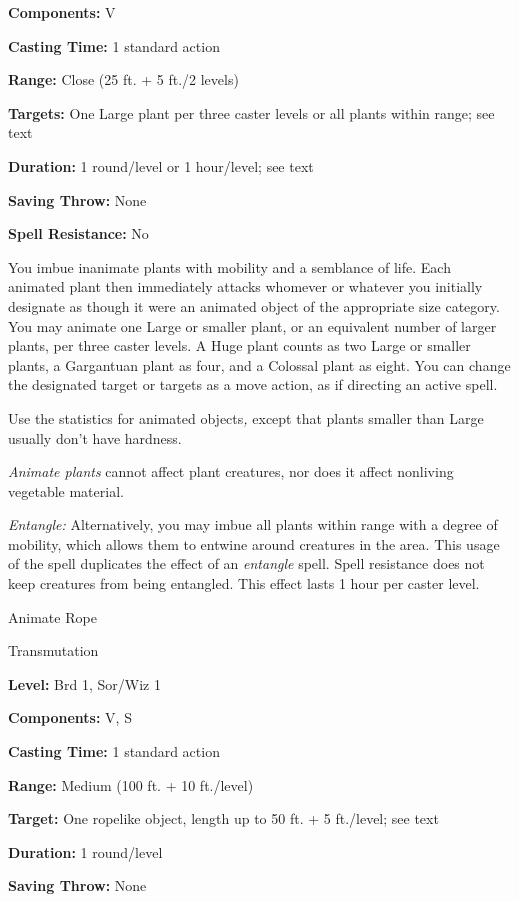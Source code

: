 \documentclass{article}
\begin{document}
\textbf{Components:} V

\textbf{Casting Time:} 1 standard action

\textbf{Range:} Close (25 ft. + 5 ft./2 levels)

\textbf{Targets:} One Large plant per three caster levels or all plants within 
range; see text

\textbf{Duration:} 1 round/level or 1 hour/level; see text

\textbf{Saving Throw:} None

\textbf{Spell Resistance:} No

You imbue inanimate plants with mobility and a semblance of life. Each animated 
plant then immediately attacks whomever or whatever you initially designate as 
though it were an animated object of the appropriate size category. You may animate 
one Large or smaller plant, or an equivalent number of larger plants, per three 
caster levels. A Huge plant counts as two Large or smaller plants, a Gargantuan 
plant as four, and a Colossal plant as eight. You can change the designated target 
or targets as a move action, as if directing an active spell.

Use the statistics for animated objects\textit{, }except that plants smaller than 
Large usually don't have hardness.

\textit{Animate plants }cannot affect plant creatures, nor does it affect nonliving 
vegetable material.

\textit{Entangle: }Alternatively, you may imbue all plants within range with a 
degree of mobility, which allows them to entwine around creatures in the area. 
This usage of the spell duplicates the effect of an \textit{entangle }spell. Spell 
resistance does not keep creatures from being entangled. This effect lasts 1 hour 
per caster level.

\vspace{12pt}
Animate Rope

Transmutation

\textbf{Level:} Brd 1, Sor/Wiz 1

\textbf{Components:} V, S

\textbf{Casting Time:} 1 standard action

\textbf{Range: }Medium (100 ft. + 10 ft./level)

\textbf{Target:} One ropelike object, length up to 50 ft. + 5 ft./level; see text

\textbf{Duration:} 1 round/level

\textbf{Saving Throw:} None
\end{document}
